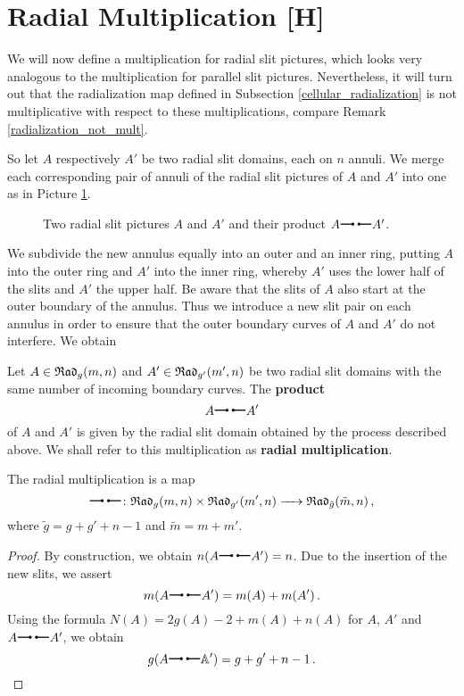 \section{Radial Multiplication [H]}
\label{homology_operations:radial_multiplication}
We will now define a multiplication for radial slit pictures,
which looks very analogous to the multiplication for parallel slit pictures.
Nevertheless, it will turn out that the radialization map defined in Subsection \ref{cellular_radialization} is not multiplicative with respect to these multiplications, compare Remark \ref{radialization_not_mult}.

So let $A$ respectively $A'$ be two radial slit domains, each on $n$ annuli.
We merge each corresponding pair of annuli of the radial slit pictures of $A$ and $A'$ into one as in Picture \ref{homology_op:radial_mult}.
\begin{figure}[ht]
\centering
{}
\centering
{}
\caption{\label{homology_op:radial_mult} Two radial slit pictures $A$ and $A'$ and their product $A \radmult A'$.}
\end{figure}
We subdivide the new annulus equally into an outer and an inner ring, putting $A$ into the outer ring and $A'$ into the inner ring,
whereby $A'$ uses the lower half of the slits and $A'$ the upper half.
Be aware that the slits of $A$ also start at the outer boundary of the annulus.
Thus we introduce a new slit pair on each annulus in order to ensure that the outer boundary curves of $A$ and $A'$ do not interfere.
We obtain

\begin{defi}
\label{rad_mult_defi}
   Let $A \in {\mathfrak{Rad}_g(m,n)}$ and $A' \in \mathfrak{Rad}_{g'}(m', n)$ be two radial slit domains
   with the same number of incoming boundary curves.
   The \textbf{product} 
   \[ 
      A \radmult A'
   \]
   of $A$ and $A'$ is given by the radial slit domain obtained by the process described above.
   We shall refer to this multiplication as \textbf{radial multiplication}. 
\end{defi}

\begin{prop}
   The radial multiplication is a map
   \[
       \radmult \colon \Rad \times \Radt_{g'}(m', n) \to \Radt_{\tilde g}(\tilde m, n)\,,
   \]
   where $\tilde g = g + g' + n - 1$ and $\tilde m = m + m'$.
\begin{proof}
   By construction, we obtain $n(A \radmult A') = n$.
   Due to the insertion of the new slits, we assert 
   \[
      m(A \radmult A') = m(A) + m(A')\,.
   \]
   Using the formula $N(A) = 2 g(A) - 2 + m(A) + n(A)$ for $A$, $A'$ and $A \radmult A'$,
   we obtain 
   \[
      g(A \radmult \A') = g + g' + n - 1\,.    
   \]
\end{proof}
\end{prop}


